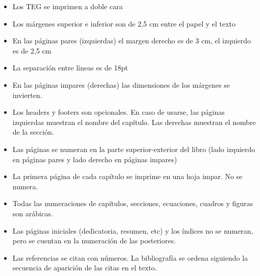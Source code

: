 \begin{itemize}
\item Los TEG se imprimen a doble cara 
\item Los márgenes superior e inferior son de 2,5 cm entre el papel y el texto 
\item En las páginas pares (izquierdas) el margen derecho es de 3 cm, el izquierdo es de 2,5 cm
\item La separaci\'on entre l\'ineas es de 18pt  
\item En las páginas impares (derechas) las dimensiones de los márgenes se invierten.
\item Los headers y footers son opcionales. En caso de usarse, las páginas izquierdas muestran el nombre del capítulo. Las derechas muestran el nombre de la sección.
\item Las páginas se numeran en la parte superior-exterior del libro (lado izquierdo en páginas pares y lado derecho en páginas impares)
\item La primera página de cada capítulo se imprime en una hoja impar. No se numera.
\item Todas las numeraciones de capítulos, secciones, ecuaciones, cuadros y figuras son arábicas. 
\item Las páginas iniciales (dedicatoria, resumen, etc) y los índices no se numeran, pero se cuentan en la numeración de las posteriores.
\item Las referencias se citan con números. La bibliografía se ordena siguiendo la secuencia de aparición de las citas en el texto.
\end{itemize}
